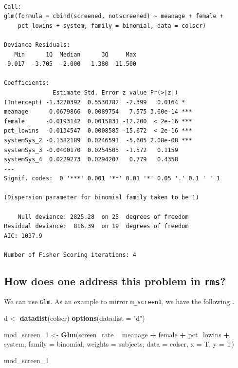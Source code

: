 \documentclass[]{book}
\newenvironment{Shaded}{\begin{snugshade}}{\end{snugshade}}
\newcommand{\KeywordTok}[1]{\textcolor[rgb]{0.13,0.29,0.53}{\textbf{#1}}}
\newcommand{\DataTypeTok}[1]{\textcolor[rgb]{0.13,0.29,0.53}{#1}}
\newcommand{\DecValTok}[1]{\textcolor[rgb]{0.00,0.00,0.81}{#1}}
\newcommand{\StringTok}[1]{\textcolor[rgb]{0.31,0.60,0.02}{#1}}
\newcommand{\OperatorTok}[1]{\textcolor[rgb]{0.81,0.36,0.00}{\textbf{#1}}}
\newcommand{\NormalTok}[1]{#1}
\theoremstyle{definition}
\theoremstyle{definition}
\theoremstyle{definition}
\theoremstyle{remark}
\begin{document}
\begin{verbatim}

Call:
glm(formula = cbind(screened, notscreened) ~ meanage + female + 
    pct_lowins + system, family = binomial, data = colscr)

Deviance Residuals: 
   Min      1Q  Median      3Q     Max  
-9.017  -3.705  -2.000   1.380  11.500  

Coefficients:
              Estimate Std. Error z value Pr(>|z|)    
(Intercept) -1.3270392  0.5530782  -2.399   0.0164 *  
meanage      0.0679866  0.0089754   7.575 3.60e-14 ***
female      -0.0193142  0.0015831 -12.200  < 2e-16 ***
pct_lowins  -0.0134547  0.0008585 -15.672  < 2e-16 ***
systemSys_2 -0.1382189  0.0246591  -5.605 2.08e-08 ***
systemSys_3 -0.0400170  0.0254505  -1.572   0.1159    
systemSys_4  0.0229273  0.0294207   0.779   0.4358    
---
Signif. codes:  0 '***' 0.001 '**' 0.01 '*' 0.05 '.' 0.1 ' ' 1

(Dispersion parameter for binomial family taken to be 1)

    Null deviance: 2825.28  on 25  degrees of freedom
Residual deviance:  816.39  on 19  degrees of freedom
AIC: 1037.9

Number of Fisher Scoring iterations: 4
\end{verbatim}

\subsection{\texorpdfstring{How does one address this problem in
\texttt{rms}?}{How does one address this problem in rms?}}\label{how-does-one-address-this-problem-in-rms}

We can use \texttt{Glm}. As an example to mirror \texttt{m\_screen1}, we
have the following\ldots{}

\begin{Shaded}
\begin{Highlighting}[]
\NormalTok{d <-}\StringTok{ }\KeywordTok{datadist}\NormalTok{(colscr)}
\KeywordTok{options}\NormalTok{(}\DataTypeTok{datadist =} \StringTok{"d"}\NormalTok{)}

\NormalTok{mod_screen_}\DecValTok{1}\NormalTok{ <-}\StringTok{  }\KeywordTok{Glm}\NormalTok{(screen_rate }\OperatorTok{~}\StringTok{ }\NormalTok{meanage }\OperatorTok{+}\StringTok{ }\NormalTok{female }\OperatorTok{+}\StringTok{ }
\StringTok{                         }\NormalTok{pct_lowins }\OperatorTok{+}\StringTok{ }\NormalTok{system, }
                     \DataTypeTok{family =}\NormalTok{ binomial, }\DataTypeTok{weights =}\NormalTok{ subjects, }
                     \DataTypeTok{data =}\NormalTok{ colscr, }\DataTypeTok{x =}\NormalTok{ T, }\DataTypeTok{y =}\NormalTok{ T)}

\NormalTok{mod_screen_}\DecValTok{1}
\end{Highlighting}
\end{Shaded}
\end{document}
